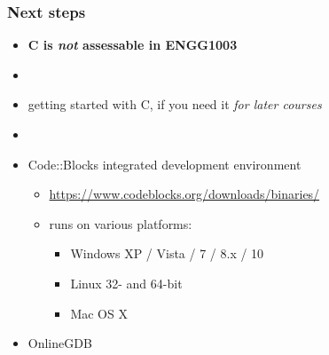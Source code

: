 \documentclass[english,14pt]{beamer}
\begin{document}
\begin{frame}[fragile]

\frametitle{Next steps}
\begin{itemize}
	\item[]\textbf{C is \emph{not} assessable in ENGG1003}
	\item[]
	\item getting started with C, if you need it \emph{for later courses}		
	\item[]
	\item Code::Blocks integrated development environment
	\begin{itemize}
		\item \href{https://www.codeblocks.org/downloads/binaries/}{https://www.codeblocks.org/downloads/binaries/}
		\item runs on various platforms:
		\begin{itemize}
			\item Windows XP / Vista / 7 / 8.x / 10
			\item Linux 32- and 64-bit
			\item Mac OS X
		\end{itemize}
	\end{itemize}
	\item OnlineGDB
\end{itemize}
	
\end{frame}
\end{document}
